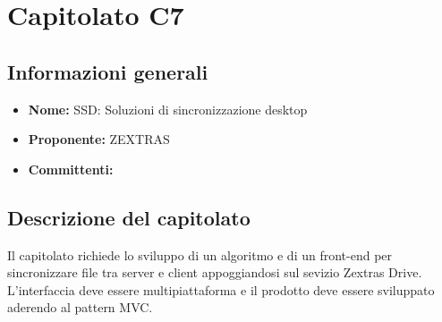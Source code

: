 \section{Capitolato C7}

\subsection{Informazioni generali}
\begin{itemize}
\item \textbf{Nome:} SSD: Soluzioni di sincronizzazione desktop
\item \textbf{Proponente:} ZEXTRAS
\item \textbf{Committenti:} \committenti{}
\end{itemize}

\subsection{Descrizione del capitolato}
Il capitolato richiede lo sviluppo di un algoritmo e di un front-end per sincronizzare file tra server e client appoggiandosi sul sevizio Zextras Drive.
L'interfaccia deve essere multipiattaforma e il prodotto deve essere sviluppato aderendo al pattern MVC.

